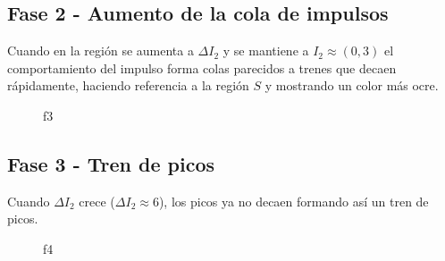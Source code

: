 \documentclass[11pt]{article}
\begin{document}
    \subsection{Fase 2 - Aumento de la cola de
impulsos}\label{fase-2---aumento-de-la-cola-de-impulsos}

Cuando en la región se aumenta a \(\Delta I_2\) y se mantiene a
\(I_2 \approx (0, 3)\) el comportamiento del impulso forma colas
parecidos a trenes que decaen rápidamente, haciendo referencia a la
región \(S\) y mostrando un color más ocre.

    \begin{figure}
\centering
{}
\caption{f3}
\end{figure}

    \subsection{Fase 3 - Tren de picos}\label{fase-3---tren-de-picos}

Cuando \(\Delta I_2\) crece (\(\Delta I_2 \approx 6\)), los picos ya no
decaen formando así un tren de picos.

    \begin{figure}
\centering
{}
\caption{f4}
\end{figure}
\end{document}
